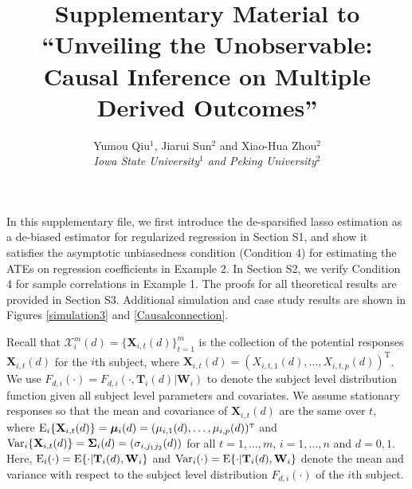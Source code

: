 \documentclass[12pt]{article}
\numberwithin{equation}{section}
\def\T{{ \mathrm{\scriptscriptstyle T} }}
\newcommand{\E}{\rm E}
\newcommand{\V}{\rm Var}
\newcommand{\bT}{{\mathbf T}}
\newcommand{\bW}{{\mathbf W}}
\newcommand{\bX}{{\mathbf X}}
\newcommand{\bOmega}{\boldsymbol{\Omega}}
\newcommand{\bSigma}{\boldsymbol{\Sigma}}
\newcommand{\bmu} {\boldsymbol{\mu}}
\begin{document}
\def\spacingset#1{\renewcommand{\baselinestretch}%
{#1}\small\normalsize} \spacingset{1.9}

\title{\Large \bf Supplementary Material to ``Unveiling the Unobservable: Causal Inference on Multiple Derived Outcomes''}

\author{\normalsize Yumou Qiu$^{1}$, Jiarui Sun$^{2}$ and Xiao-Hua Zhou$^{2}$ \\
\normalsize \textit{Iowa State University$^{1}$ and Peking University$^{2}$}}
\date{}
\maketitle


\setcounter{equation}{0}
\def\theequation{S.\arabic{equation}}

\setcounter{section}{0}
\def\thesection{S\arabic{section}}

\setcounter{table}{0}
\renewcommand{\thetable}{S\arabic{table}}

\setcounter{figure}{0}
\renewcommand{\thefigure}{S\arabic{figure}}


In this supplementary file, we first introduce the de-sparsified lasso estimation as a de-biased estimator for regularized regression in Section S1, and show it satisfies the asymptotic unbiasedness condition (Condition 4) for estimating the ATEs on regression coefficients in Example 2.
In Section S2, we verify Condition 4 for sample correlations in Example 1.
The proofs for all theoretical results are provided in Section S3.
Additional simulation and case study results are shown in Figures \ref{simulation3} and \ref{Causalconnection}.

Recall that $\mathcal{X}_i^m(d) = \{\bX_{i, t}(d)\}_{t=1}^{m}$ is the collection of the potential responses $\bX_{i, t}(d)$ for the $i$th subject, 
where $\bX_{i, t}(d) = (X_{i, t, 1}(d), \ldots, X_{i, t, p}(d))^{\T}$.
We use $F_{d, i}(\cdot) = F_{d, i}(\cdot, \bT_{i}(d) | \bW_{i})$ to denote the subject level distribution function given all subject level parameters and covariates.
We assume stationary responses so that the mean and covariance of $\bX_{i, t}(d)$ are the same over $t$, where ${\E}_{i}\{\bX_{i, t}(d)\} = \bmu_{i}(d) = (\mu_{i, 1}(d), \ldots, \mu_{i, p}(d))^{\T}$ and ${\V}_{i}\{\bX_{i, t}(d)\} = \bSigma_{i}(d) = (\sigma_{i, j_1j_2}(d))$ for all $t = 1, \ldots, m$, $i = 1, \ldots, n$ and $d = 0, 1$.
Here, ${\E}_i(\cdot) = {\E}\{\cdot | \bT_i(d), \bW_i\}$ and ${\V}_i(\cdot) = {\E}\{\cdot | \bT_i(d), \bW_i\}$ denote the mean and variance with respect to the subject level distribution $F_{d, i}(\cdot)$ of the $i$th subject. 
\end{document}
